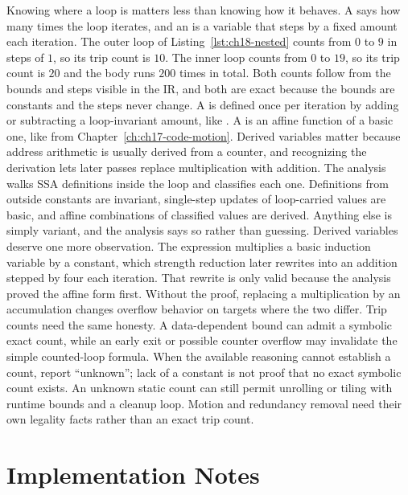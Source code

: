 Knowing where a loop is matters less than knowing how it behaves.
A  says how many times the loop iterates, and an  is a variable that steps by a fixed amount each iteration.
The outer loop of Listing~\ref{lst:ch18-nested} counts  from $0$ to $9$ in steps of $1$, so its trip count is $10$.
The inner loop counts  from $0$ to $19$, so its trip count is $20$ and the body runs $200$ times in total.
Both counts follow from the bounds and steps visible in the IR, and both are exact because the bounds are constants and the steps never change.
A  is defined once per iteration by adding or subtracting a loop-invariant amount, like .
A  is an affine function of a basic one, like  from Chapter~\ref{ch:ch17-code-motion}.
Derived variables matter because address arithmetic is usually derived from a counter, and recognizing the derivation lets later passes replace multiplication with addition.
The analysis walks SSA definitions inside the loop and classifies each one.
Definitions from outside constants are invariant, single-step updates of loop-carried values are basic, and affine combinations of classified values are derived.
Anything else is simply variant, and the analysis says so rather than guessing.
Derived variables deserve one more observation.
The expression  multiplies a basic induction variable by a constant, which strength reduction later rewrites into an addition stepped by four each iteration.
That rewrite is only valid because the analysis proved the affine form first.
Without the proof, replacing a multiplication by an accumulation changes overflow behavior on targets where the two differ.
Trip counts need the same honesty.
A data-dependent bound can admit a symbolic exact count, while an early exit or possible counter overflow may invalidate the simple counted-loop formula.
When the available reasoning cannot establish a count, report \enquote{unknown}; lack of a constant is not proof that no exact symbolic count exists.
An unknown static count can still permit unrolling or tiling with runtime bounds and a cleanup loop.
Motion and redundancy removal need their own legality facts rather than an exact trip count.

\section{Implementation Notes}
\label{sec:ch18-implementation}

